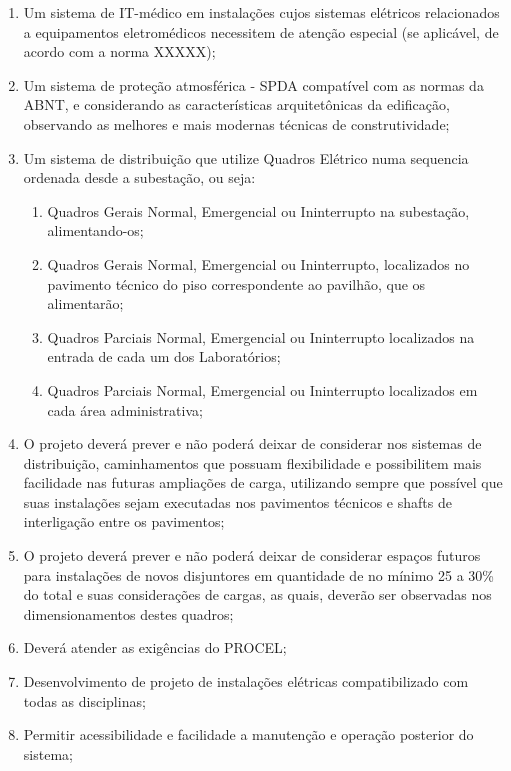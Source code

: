 \begin{enumerate}
	\item Um sistema de IT-médico em instalações cujos sistemas elétricos relacionados a equipamentos eletromédicos necessitem de atenção especial (se aplicável, de acordo com a norma XXXXX); 
	
	\item Um sistema de proteção atmosférica - SPDA compatível com as normas da ABNT, e considerando as características arquitetônicas da edificação, observando as melhores e mais modernas técnicas de construtividade;
	
	\item Um sistema de distribuição que utilize Quadros Elétrico numa sequencia ordenada desde a subestação, ou seja:
		\begin{enumerate}
			\item Quadros Gerais Normal, Emergencial ou Ininterrupto na subestação, alimentando-os;
			\item Quadros Gerais Normal, Emergencial ou Ininterrupto, localizados no pavimento técnico do piso correspondente ao pavilhão, que os alimentarão;
			\item Quadros Parciais Normal, Emergencial ou Ininterrupto localizados na entrada de cada um dos Laboratórios;
			\item Quadros Parciais Normal, Emergencial ou Ininterrupto localizados em cada área administrativa;
		\end{enumerate}
	
	\item O projeto deverá prever e não poderá deixar de considerar nos sistemas de distribuição, caminhamentos que possuam flexibilidade e possibilitem mais facilidade nas futuras ampliações de carga, utilizando sempre que possível que suas instalações sejam executadas nos pavimentos técnicos e shafts de interligação entre os pavimentos;
	
	\item O projeto deverá prever e não poderá deixar de considerar espaços futuros para instalações de novos disjuntores em quantidade de no mínimo 25 a 30\% do total e suas considerações de cargas, as quais, deverão ser observadas nos dimensionamentos destes quadros; 
	
	\item Deverá atender as exigências do PROCEL;
	
	\item Desenvolvimento de projeto de instalações elétricas compatibilizado com todas as disciplinas;
	
	\item Permitir acessibilidade e facilidade a manutenção e operação posterior do sistema;
\end{enumerate}